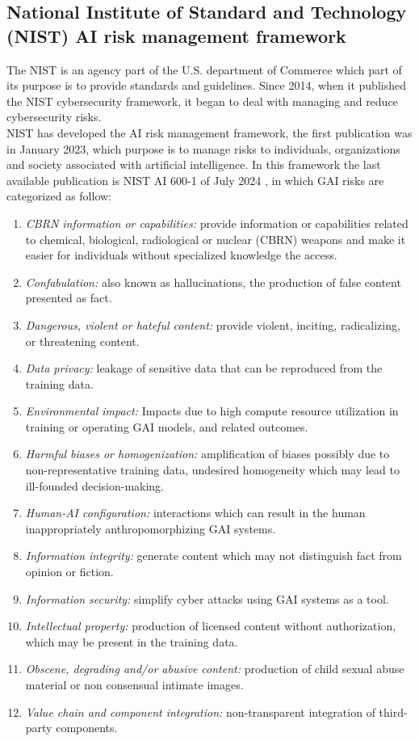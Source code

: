 \documentclass[12pt]{article}
\begin{document}
    \subsection{National Institute of Standard and Technology (NIST) AI risk management framework}
The NIST is an agency part of the U.S. department of Commerce which part of its purpose is to provide standards and guidelines. Since 2014, when it published the NIST cybersecurity framework, it began to deal with managing and reduce cybersecurity risks.\\
NIST has developed the AI risk management framework, the first publication was in January 2023, which purpose is to manage risks to individuals, organizations and society associated with artificial intelligence.\cite{AIRiskManagementFramework}
In this framework the last available publication is NIST AI 600-1 of July 2024 \cite{NIST-AI-600-1}, in which GAI risks are categorized as follow:
\begin{enumerate}
	\item \textit{CBRN information or capabilities:} provide information or capabilities related to chemical, biological, radiological or nuclear (CBRN) weapons and make it easier for individuals without specialized knowledge the access.
	\item \textit{Confabulation:} also known as hallucinations, the production of false content presented as fact.
	\item \textit{Dangerous, violent or hateful content:} provide violent, inciting, radicalizing, or threatening content.
	\item \textit{Data privacy:} leakage of sensitive data that can be reproduced from the training data.
	\item \textit{Environmental impact:} Impacts due to high compute resource utilization in training or operating GAI models, and related outcomes.
	\item \textit{Harmful biases or homogenization:} amplification of biases possibly due to non-representative training data, undesired homogeneity which may lead to ill-founded decision-making.
	\item \textit{Human-AI configuration:} interactions which can result in the human inappropriately anthropomorphizing GAI systems.
	\item \textit{Information integrity:} generate content which may not distinguish fact from opinion or fiction.
	\item \textit{Information security:} simplify cyber attacks using GAI systems as a tool.
	\item \textit{Intellectual property:} production of licensed content without authorization, which may be present in the training data.
	\item \textit{Obscene, degrading and/or abusive content:} production of child sexual abuse material or non consensual intimate images.
	\item \textit{Value chain and component integration:} non-transparent integration of third-party components.
\end{enumerate}
     
\end{document}

